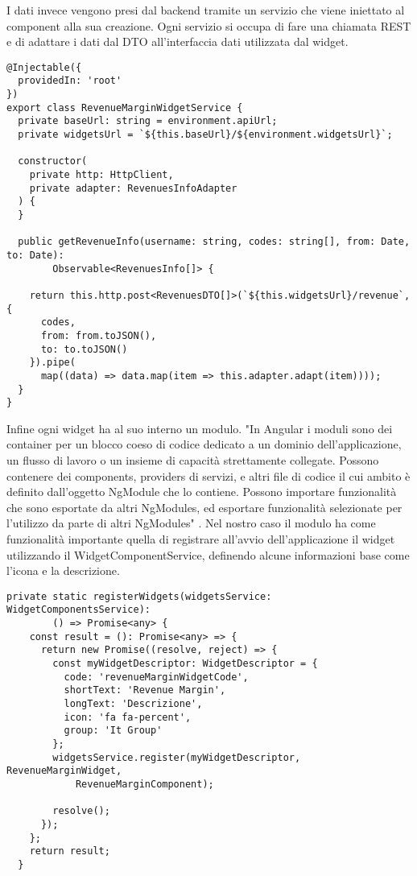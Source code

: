 I dati invece vengono presi dal backend tramite un servizio che viene iniettato al component alla sua creazione. Ogni servizio si occupa di fare una chiamata REST e di adattare i dati dal DTO all'interfaccia dati utilizzata dal widget. \\

\begin{lstlisting}[caption={File revenue-margin.service.ts}, style=javaScriptCode]
@Injectable({
  providedIn: 'root'
})
export class RevenueMarginWidgetService {
  private baseUrl: string = environment.apiUrl;
  private widgetsUrl = `${this.baseUrl}/${environment.widgetsUrl}`;

  constructor(
    private http: HttpClient,
    private adapter: RevenuesInfoAdapter
  ) {
  }

  public getRevenueInfo(username: string, codes: string[], from: Date, to: Date): 
        Observable<RevenuesInfo[]> {

    return this.http.post<RevenuesDTO[]>(`${this.widgetsUrl}/revenue`, {
      codes,
      from: from.toJSON(),
      to: to.toJSON()
    }).pipe(
      map((data) => data.map(item => this.adapter.adapt(item))));
  }
}
\end{lstlisting}
Infine ogni widget ha al suo interno un modulo. "In Angular i moduli sono dei container per un blocco coeso di codice dedicato a un dominio dell'applicazione, un flusso di lavoro o un insieme di capacità strettamente collegate. Possono contenere dei components, providers di servizi, e altri file di codice il cui ambito è definito dall'oggetto NgModule che lo contiene. Possono importare funzionalità che sono esportate da altri NgModules, ed esportare funzionalità selezionate per l'utilizzo da parte di altri NgModules" \cite{MODULE}. Nel nostro caso il modulo ha come funzionalità importante quella di registrare all'avvio dell'applicazione il widget utilizzando il WidgetComponentService, definendo alcune informazioni base come l'icona e la descrizione. \\

\begin{lstlisting}[caption={Metodo all'interno del modulo che registra il widget nel sistema}, style=javaScriptCode]
private static registerWidgets(widgetsService: WidgetComponentsService): 
        () => Promise<any> {
    const result = (): Promise<any> => {
      return new Promise((resolve, reject) => {
        const myWidgetDescriptor: WidgetDescriptor = {
          code: 'revenueMarginWidgetCode',
          shortText: 'Revenue Margin',
          longText: 'Descrizione',
          icon: 'fa fa-percent',
          group: 'It Group'
        };
        widgetsService.register(myWidgetDescriptor, RevenueMarginWidget, 
            RevenueMarginComponent);

        resolve();
      });
    };
    return result;
  }
\end{lstlisting}


